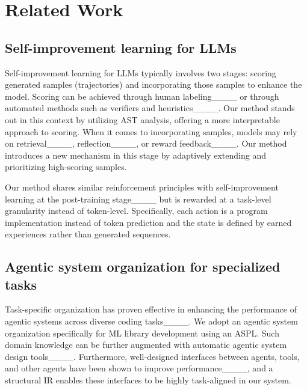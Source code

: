 \section{Related Work}
\subsection{Self-improvement learning for LLMs}
Self-improvement learning for LLMs typically involves two stages: scoring generated samples (trajectories) and incorporating those samples to enhance the model. Scoring can be achieved through human labeling____ or through automated methods such as verifiers and heuristics____. Our method stands out in this context by utilizing AST analysis, offering a more interpretable approach to scoring. When it comes to incorporating samples, models may rely on retrieval____, reflection____, or reward feedback____. Our method introduces a new mechanism in this stage by adaptively extending and prioritizing high-scoring samples. 

Our method shares similar reinforcement principles with self-improvement learning at the post-training stage____ but is rewarded at a task-level granularity instead of token-level. Specifically, each action is a program implementation instead of token prediction and the state is defined by earned experiences rather than generated sequences.

\subsection{Agentic system organization for specialized tasks}
Task-specific organization has proven effective in enhancing the performance of agentic systems across diverse coding tasks____. We adopt an agentic system organization specifically for ML library development using an ASPL. Such domain knowledge can be further augmented with automatic agentic system design tools____. Furthermore, well-designed interfaces between agents, tools, and other agents have been shown to improve performance____, and a structural IR enables these interfaces to be highly task-aligned in our system.

